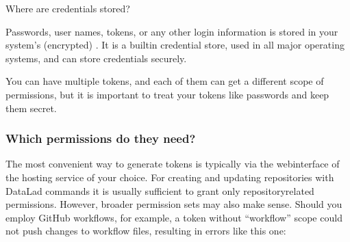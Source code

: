 \ignorespaces \begin{findoutmore}[label={fom-credential-storage}, before title={\thetcbcounter\ }, float, floatplacement=tb, check odd page=true]{Where are credentials stored?}
\label{\detokenize{basics/101-139-hostingservices:fom-credential-storage}}

\sphinxAtStartPar
Passwords, user names, tokens, or any other login information is stored in
your system’s (encrypted) .
It is a built\sphinxhyphen{}in credential store, used in all major operating systems, and
can store credentials securely.


\end{findoutmore}

\sphinxAtStartPar
You can have multiple tokens, and each of them can get a different scope of permissions, but it is important to treat your tokens like passwords and keep them secret.


\subsubsection{Which permissions do they need?}
\label{\detokenize{basics/101-139-hostingservices:which-permissions-do-they-need}}
\sphinxAtStartPar
The most convenient way to generate tokens is typically via the webinterface of the hosting service of your choice.
For creating and updating repositories with DataLad commands it is usually sufficient to grant only repository\sphinxhyphen{}related permissions.
However, broader permission sets may also make sense.
Should you employ GitHub workflows, for example, a token without “workflow” scope could not push changes to workflow files, resulting in errors like this one:

\begin{sphinxVerbatim}[commandchars=\\\{\}]
\PYG{g+go}{[remote rejected] (refusing to allow a Personal Access Token to create or update workflow `.github/workflows/benchmarks.yml` without `workflow` scope)]}
\end{sphinxVerbatim}

\sphinxstepscope

\ignorespaces 

